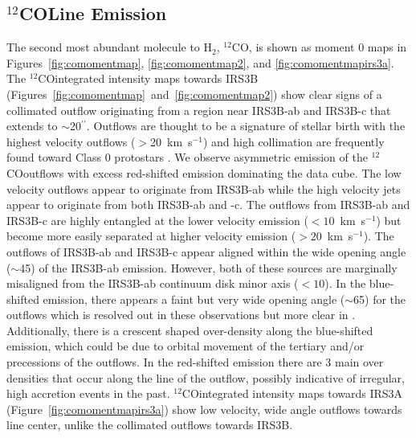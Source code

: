 \documentclass[twocolumn, 12pt]{aastex63}
\newcommand{\co}{$^{12}$CO}
\renewcommand{\arcsec}{$^{\prime\prime}$}
\renewcommand{\deg}{\degr}
\newcommand{\ab}{$\sim$}
\begin{document}
\subsection{\co\space Line Emission}\label{sec:coemission}
The second most abundant molecule to H$_{2}$, $^{12}$CO, is shown as moment 0 maps in Figures~\ref{fig:comomentmap}, \ref{fig:comomentmap2}, and \ref{fig:comomentmapirs3a}. The \co\space integrated intensity maps towards IRS3B (Figures~\ref{fig:comomentmap}~and~\ref{fig:comomentmap2}) show clear signs of a collimated outflow originating from a region near IRS3B-ab and IRS3B-c that extends to \ab20\arcsec. Outflows are thought to be a signature of stellar birth with the highest velocity outflows ($>$20~km~s$^{-1}$) and high collimation are frequently found toward Class 0 protostars \citep[][]{1993ApJ...406..122A}. We observe asymmetric emission of the \co\space outflows with excess red-shifted emission dominating the data cube. The low velocity outflows appear to originate from IRS3B-ab while the high velocity jets appear to originate from both IRS3B-ab and -c. The outflows from IRS3B-ab and IRS3B-c are highly entangled at the lower velocity emission ($<10$~km~s$^{-1}$) but become more easily separated at higher velocity emission ($>20$~km~s$^{-1}$). The outflows of IRS3B-ab and IRS3B-c appear aligned within the wide opening angle (\ab45\deg) of the IRS3B-ab emission. However, both of these sources are marginally misaligned from the IRS3B-ab continuum disk minor axis ($<10$\deg). In the blue-shifted emission, there appears a faint but very wide opening angle (\ab65\deg) for the outflows which is resolved out in these observations but more clear in \citet{2016Natur.538..483T}. Additionally, there is a crescent shaped over-density along the blue-shifted emission, which could be due to orbital movement of the tertiary and/or precessions of the outflows. In the red-shifted emission there are 3 main over densities that occur along the line of the outflow, possibly indicative of irregular, high accretion events in the past. \co\space integrated intensity maps towards IRS3A (Figure~\ref{fig:comomentmapirs3a}) show low velocity, wide angle outflows towards line center, unlike the collimated outflows towards IRS3B.
\end{document}
